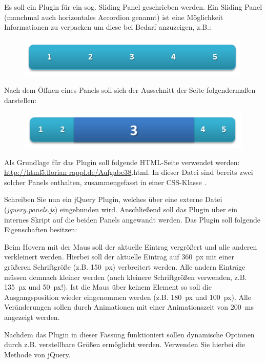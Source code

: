 %
\par Es soll ein Plugin für ein sog. Sliding Panel geschrieben werden. Ein Sliding Panel (manchmal auch horizontales Accordion genannt) ist eine Möglichkeit Informationen zu verpacken um diese bei Bedarf anzuzeigen, z.B.:
%
\begin{figure}[!h]
\centering
\includegraphics{Figures/pluginclose.png}
\end{figure}
%
\par Nach dem Öffnen eines Panels soll sich der Ausschnitt der Seite folgendermaßen darstellen:
%
\begin{figure}[!h]
\centering
\includegraphics{Figures/pluginopen.png}
\end{figure}
%
\par Als Grundlage für das Plugin soll folgende HTML-Seite verwendet werden: \url{http://html5.florian-rappl.de/Aufgabe38}.html. In dieser Datei sind bereits zwei solcher Panels enthalten, zusammengefasst in einer CSS-Klasse .
%
\par Schreiben Sie nun ein jQuery Plugin, welches über eine externe Datei (\emph{jquery.panels.js}) eingebunden wird. Anschließend soll das Plugin über ein internes Skript auf die beiden Panels angewandt werden. Das Plugin soll folgende Eigenschaften besitzen:
%
\par Beim Hovern mit der Maus soll der aktuelle Eintrag vergrößert und alle anderen verkleinert werden. Hierbei soll der aktuelle Eintrag auf \qty{360}{px} mit einer größeren Schriftgröße (z.B. \qty{150}{px}) verbreitert werden. Alle andern Einträge müssen demnach kleiner werden (auch kleinere Schriftgrößen verwenden, z.B. \qty{135}{px} und \qty{50}{px}!). Ist die Maus über keinem Element so soll die Ausgangsposition wieder eingenommen werden (z.B. \qty{180}{px} und \qty{100}{px}). Alle Veränderungen sollen durch Animationen mit einer Animationszeit von \qty{200}{ms} angezeigt werden.
%
\par Nachdem das Plugin in dieser Fassung funktioniert sollen dynamische Optionen durch z.B. verstellbare Größen ermöglicht werden. Verwenden Sie hierbei die  Methode von jQuery.